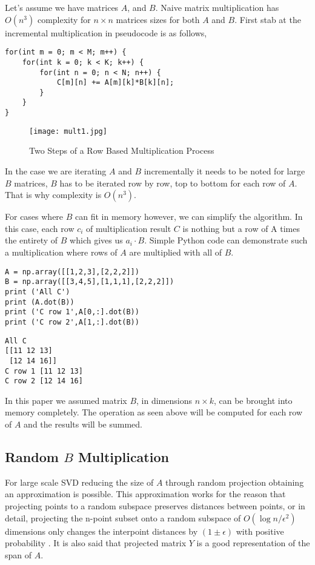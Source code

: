 \documentclass{article}
\begin{document}
Let's assume we have matrices $A$, and $B$. Naive matrix multiplication has
$O(n^3)$ complexity for $n \times n$ matrices sizes for both $A$ and $B$. First
stab at the incremental multiplication in pseudocode is as follows,

\begin{verbatim}
for(int m = 0; m < M; m++) {
    for(int k = 0; k < K; k++) {
        for(int n = 0; n < N; n++) {
            C[m][n] += A[m][k]*B[k][n];
        }
    }
}
\end{verbatim}

\begin{figure}[h]
  \centering
  \texttt{[image: mult1.jpg]}
  \caption{Two Steps of a Row Based Multiplication Process}
  \label{fig:mult1}
\end{figure}

In the case we are iterating $A$ and $B$ incrementally it needs to be noted for
large $B$ matrices, $B$ has to be iterated row by row, top to bottom for each
row of $A$. That is why complexity is $O(n^3)$.

For cases where $B$ can fit in memory however, we can simplify the algorithm.
In this case, each row $c_i$ of multiplication result $C$ is nothing but a row
of A times the entirety of $B$ which gives us $a_i \cdot B$. Simple Python code
can demonstrate such a multiplication where rows of $A$ are multiplied with all
of $B$.

\begin{verbatim}
A = np.array([[1,2,3],[2,2,2]])
B = np.array([[3,4,5],[1,1,1],[2,2,2]])
print ('All C')
print (A.dot(B))
print ('C row 1',A[0,:].dot(B))
print ('C row 2',A[1,:].dot(B))
\end{verbatim}

\begin{verbatim}
All C
[[11 12 13]
 [12 14 16]]
C row 1 [11 12 13]
C row 2 [12 14 16]
\end{verbatim}

In this paper we assumed matrix $B$, in dimensions $n \times k$, can be brought
into memory completely. The operation as seen above will be computed for each
row of $A$ and the results will be summed.

\subsection{Random $B$ Multiplication}

For large scale SVD reducing the size of $A$ through random projection obtaining
an approximation is possible. This approximation works for the reason that
projecting points to a random subspace preserves distances between points, or in
detail, projecting the n-point subset onto a random subspace of $O(\log
n/\epsilon^2)$ dimensions only changes the interpoint distances by $(1 \pm
\epsilon)$ with positive probability \cite{gupta}. It is also said that
projected matrix $Y$ is a good representation of the span of $A$.
\end{document}
